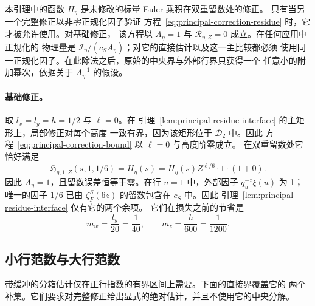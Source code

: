 本引理中的函数 $H_\eta$ 是未修改的标量 Euler 乘积在双重留数处的修正。
只有当另一个完整修正以非零正规化因子验证
方程~\eqref{eq:principal-correction-residue} 时，它才被允许使用。对基础修正，
该方程以 $A_\eta=1$ 与 $\mathcal R_{\eta,Z}=0$ 成立。在任何应用中正规化的
物理量是 $\mathscr I_\eta/(c_SA_\eta)$；对它的直接估计以及这一主比较都必须
使用同一正规化因子。在此除法之后，原始的中央界与外部行界只获得一个
任意小的附加幂次，依据关于 $A_\eta^{-1}$ 的假设。

\paragraph{基础修正。}

取 $l_x=l_y=h=1/2$ 与 $\ell=0$。在
引理~\ref{lem:principal-residue-interface} 的主矩形上，局部修正对每个高度
一致有界，因为该矩形位于 $\mathcal D_2$ 中。因此
方程~\eqref{eq:principal-correction-bound} 以 $\ell=0$ 与高度阶零成立。
在双重留数处它恰好满足
\[
 \mathfrak H_{\eta,1,Z}(s,1,1/6)=H_\eta(s)
       =H_\eta(s)Z^{\ell/6}\cdot1\cdot(1+0).
\]
因此 $A_\eta=1$，且留数误差恒等于零。在行 $u=1$ 中，外部因子
$q_u^{-z}\overline{\xi(u)}$ 为 1；唯一的因子 $1/6$ 已由
$\zeta_F^S(6z)$ 的留数包含在 $c_S$ 中。因此
引理~\ref{lem:principal-residue-interface} 仅有它的两个余项。
它们在损失之前的节省是
\[
 m_w=\frac{l_y}{20}=\frac1{40},\qquad
 m_z=\frac h{600}=\frac1{1200}.
\]

\subsection{小行范数与大行范数}

带缓冲的分箱估计仅在正行指数的有界区间上需要。下面的直接界覆盖它的
两个补集。它们要求对完整修正给出显式的绝对估计，并且不使用它的中央分解。


